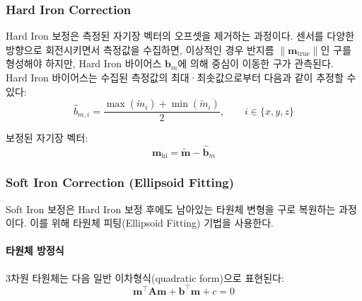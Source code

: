         \subsubsection{Hard Iron Correction}
            Hard Iron 보정은 측정된 자기장 벡터의 오프셋을 제거하는 과정이다. 센서를 다양한 방향으로 회전시키면서 측정값을 수집하면, 이상적인 경우 반지름 $\|\mathbf{m}_{\text{true}}\|$인 구를 형성해야 하지만, Hard Iron 바이어스 $\mathbf{b}_m$에 의해 중심이 이동한 구가 관측된다.\\

            Hard Iron 바이어스는 수집된 측정값의 최대·최솟값으로부터 다음과 같이 추정할 수 있다:\\

            \begin{equation}
                \hat{b}_{m,i} = \frac{\max(\tilde{m}_i) + \min(\tilde{m}_i)}{2}, \qquad i \in \{x, y, z\}
                \label{eq:hard_iron_est}
            \end{equation}

            보정된 자기장 벡터:\\

            \begin{equation}
                \mathbf{m}_{\text{hi}} = \tilde{\mathbf{m}} - \hat{\mathbf{b}}_m
                \label{eq:hard_iron_calib}
            \end{equation}

        \subsubsection{Soft Iron Correction (Ellipsoid Fitting)}
            Soft Iron 보정은 Hard Iron 보정 후에도 남아있는 타원체 변형을 구로 복원하는 과정이다. 이를 위해 타원체 피팅(Ellipsoid Fitting) 기법을 사용한다.\\

            \paragraph{타원체 방정식}
                3차원 타원체는 다음 일반 이차형식(quadratic form)으로 표현된다:\\

                \begin{equation}
                    \mathbf{m}^\top \mathbf{A} \mathbf{m} + \mathbf{b}^\top \mathbf{m} + c = 0
                    \label{eq:ellipsoid_general}
                \end{equation}

